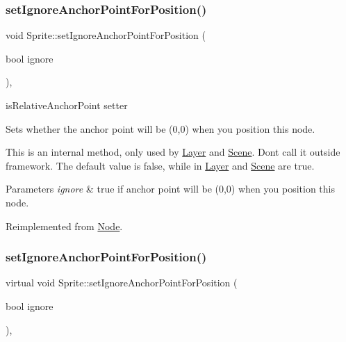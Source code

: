 \subsubsection{\texorpdfstring{set\+Ignore\+Anchor\+Point\+For\+Position()}{setIgnoreAnchorPointForPosition()}\hspace{0.1cm}{\footnotesize\ttfamily [1/2]}}
{\footnotesize\ttfamily void Sprite\+::set\+Ignore\+Anchor\+Point\+For\+Position (\begin{DoxyParamCaption}\item[{bool}]{ignore }\end{DoxyParamCaption})\hspace{0.3cm}{\ttfamily [override]}, {\ttfamily [virtual]}}



is\+Relative\+Anchor\+Point setter 

Sets whether the anchor point will be (0,0) when you position this node.

This is an internal method, only used by \hyperlink{classLayer}{Layer} and \hyperlink{classScene}{Scene}. Don\textquotesingle{}t call it outside framework. The default value is false, while in \hyperlink{classLayer}{Layer} and \hyperlink{classScene}{Scene} are true.


\begin{DoxyParams}{Parameters}
{\em ignore} & true if anchor point will be (0,0) when you position this node. \\
\hline
\end{DoxyParams}


Reimplemented from \hyperlink{classNode_a75e8f6a6a46358d6faf8683e720d47b5}{Node}.

\mbox{\label{classSprite_a0466d4642ed98aefe0febeb4a20bb78f}} 
\subsubsection{\texorpdfstring{set\+Ignore\+Anchor\+Point\+For\+Position()}{setIgnoreAnchorPointForPosition()}\hspace{0.1cm}{\footnotesize\ttfamily [2/2]}}
{\footnotesize\ttfamily virtual void Sprite\+::set\+Ignore\+Anchor\+Point\+For\+Position (\begin{DoxyParamCaption}\item[{bool}]{ignore }\end{DoxyParamCaption})\hspace{0.3cm}{\ttfamily [override]}, {\ttfamily [virtual]}}



